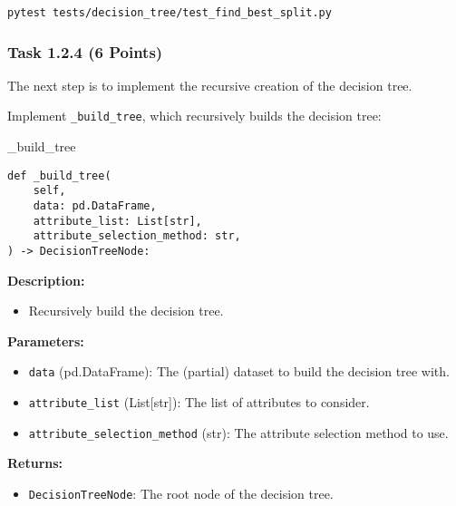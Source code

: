 \documentclass[
english,
smallborders
]{i6prcsht}
\newcommand{\points}[1]{\hfill \color{red}(#1 Points)\color{black}}
\begin{document}
\vspace*{0.3cm}

\begin{lstlisting}
pytest tests/decision_tree/test_find_best_split.py
\end{lstlisting}

\newpage

\subsubsection*{Task 1.2.4 \points{6}}

The next step is to implement the recursive creation of the decision tree.

Implement \texttt{\_build\_tree}, which recursively builds the decision tree:

\vspace*{0.3cm}

\begin{functionbox}{\_build\_tree}
	\begin{lstlisting}[numbers=none]
def _build_tree(
    self,
    data: pd.DataFrame,
    attribute_list: List[str],
    attribute_selection_method: str,
) -> DecisionTreeNode:
\end{lstlisting}
	
	\textbf{Description:}
	\begin{itemize}[leftmargin=*,topsep=0pt]
		\item Recursively build the decision tree.
	\end{itemize}
	
	\textbf{Parameters:}
	\begin{itemize}[leftmargin=*,topsep=0pt]
		\item \texttt{data} (pd.DataFrame): The (partial) dataset to build the decision tree with.
		\item \texttt{attribute\_list} (List[str]): The list of attributes to consider.
		\item \texttt{attribute\_selection\_method} (str): The attribute selection method to use.
	\end{itemize}
	
	\textbf{Returns:}
	\begin{itemize}[leftmargin=*,topsep=0pt]
		\item \texttt{DecisionTreeNode}: The root node of the decision tree.
	\end{itemize}
\end{functionbox}

\vspace*{0.5cm}
\end{document}
